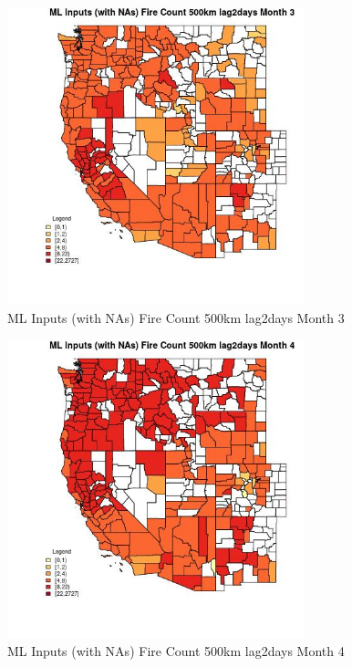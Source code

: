 \begin{figure} 
\centering  
\includegraphics[width=0.77\textwidth]{Code_Outputs/Report_ML_input_PM25_Step4_part_f_de_duplicated_aves_prioritize_24hr_obswNAs_CountyFire_Count_500km_lag2daysmedianMonth3.jpg} 
\caption{\label{fig:Report_ML_input_PM25_Step4_part_f_de_duplicated_aves_prioritize_24hr_obswNAsCountyFire_Count_500km_lag2daysmedianMonth3}ML Inputs (with NAs) Fire Count 500km lag2days Month 3} 
\end{figure} 
 

\begin{figure} 
\centering  
\includegraphics[width=0.77\textwidth]{Code_Outputs/Report_ML_input_PM25_Step4_part_f_de_duplicated_aves_prioritize_24hr_obswNAs_CountyFire_Count_500km_lag2daysmedianMonth4.jpg} 
\caption{\label{fig:Report_ML_input_PM25_Step4_part_f_de_duplicated_aves_prioritize_24hr_obswNAsCountyFire_Count_500km_lag2daysmedianMonth4}ML Inputs (with NAs) Fire Count 500km lag2days Month 4} 
\end{figure} 
 

